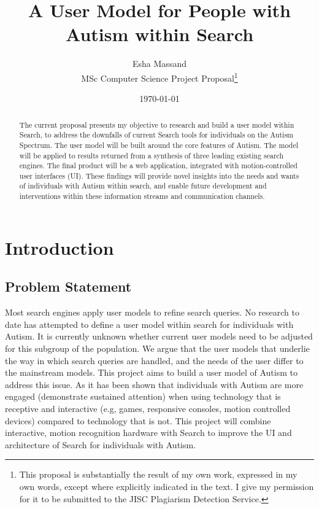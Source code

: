 \documentclass[10pt]{article}
\begin{document}
\title{A User Model for People with Autism within Search }
\author{Esha Massand\\
MSc Computer Science Project Proposal\footnote{This proposal is substantially the result of my own work, expressed in my own words, except where explicitly indicated in the text. I give my permission for it to be submitted to the JISC Plagiarism Detection Service. }}
\date{\today}
\maketitle

\begin{abstract}
The current proposal presents my objective to research and build a user model within Search, to address the downfalls of current Search tools for individuals on the Autism Spectrum. The user model will be built around the core features of Autism. The model will be applied to results returned from a synthesis of three leading existing search engines. The final product will be a web application, integrated with motion-controlled user interfaces (UI). These findings will provide novel insights into the needs and wants of individuals with Autism within search, and enable future development and interventions within these information streams and communication channels.
\end{abstract}

\tableofcontents

\section{Introduction}
\subsection{Problem Statement} \label{prob}
Most search engines apply user models to refine search queries. No research to date has attempted to define a user model within search for individuals with Autism. It is currently unknown whether current user models need to be adjusted for this subgroup of the population. We argue that the user models that underlie the way in which search queries are handled, and the needs of the user differ to the mainstream models. This project aims to build a user model of Autism to address this issue.
As it has been shown that individuals with Autism are more engaged (demonstrate sustained attention) when using technology that is receptive and interactive (e.g, games, responsive consoles, motion controlled devices) compared to technology that is not. This project will combine interactive, motion recognition hardware with Search to improve the UI and architecture of Search for individuals with Autism.
\end{document}
